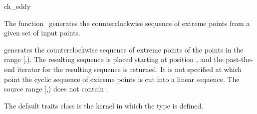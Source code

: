 
\begin{ccRefFunction}{ch_eddy}  %

\ccDefinition
  
The function \ccRefName\ generates the counterclockwise sequence of extreme
points from a given set of input points.



            {generates the counterclockwise sequence of extreme points
            of the points in the range [,).
            The resulting sequence is placed starting at position
            , and the past-the-end iterator for the resulting
            sequence is returned. It is not specified at which point the
            cyclic sequence of extreme points is cut into a linear sequence.
            \ccPrecond %
            The source range [,) does not contain
            .}

The default traits class  is the kernel in which the
type  is defined.



\end{ccRefFunction}
